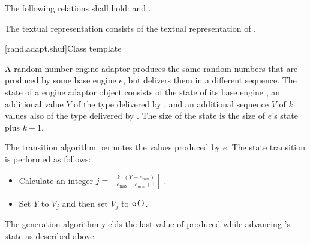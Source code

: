 \pnum
The following relations shall hold:
and
  .

\pnum
The textual representation
consists of the textual representation of .



[rand.adapt.shuf]{Class template }%
%

\pnum
A  random number engine adaptor
produces the same random numbers
that are produced by some base engine $e$,
but delivers them in a different sequence.
The state 
of a  engine adaptor object 
consists of
 the state  of its base engine ,
 an additional value $Y$ of the type delivered by ,
and
 an additional sequence $V$ of $k$ values
 also of the type delivered by .
The size of the state is
 the size of $e$'s state plus $k + 1$.

\pnum
The transition algorithm
permutes the values produced by $e$.
The state transition is performed as follows:
\begin{itemize}
 \item
   Calculate an integer
   $j = \left\lfloor \frac{k \cdot (Y - e_{\min})}
                          {e_{\max} - e_{\min} +1}
        \right\rfloor
   $%
   .
 \item
   Set $Y$ to $V_j$ and then set $V_j$ to $\texttt{\protect e()}$.
\end{itemize}

\pnum
The generation algorithm
yields the last value of 
 produced while advancing 's state as described above.

